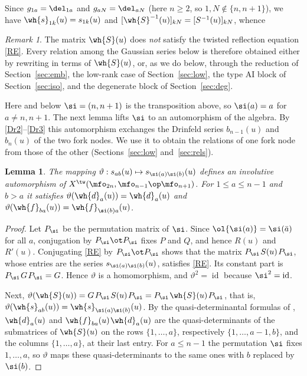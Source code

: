 \documentclass{amsart}
\newtheorem{lemma}[theorem]{Lemma}
\numberwithin{equation}{section}
\theoremstyle{remark}
\newtheorem{remark}[theorem]{Remark}
\DeclareMathOperator{\id}{id}
\renewcommand{\,}{\kern 0.1em} %
\begin{document}
Since $g_{1a} = \del_{1a}$ and $g_{aN} = \del_{aN}$ (here $n\ge2$, so $1,N\notin\{n,n+1\}$), we
have $\wh{s}_{1k}(u) = s_{1k}(u)$ and $[\wh{S}^{-1}(u)]_{kN} = [S^{-1}(u)]_{kN}$, whence
%
\equ{
s_{11}(u) = \wh{d}_1(u) , \qq \big[S^{-1}(u)\big]_{NN} = \wh{d}^{\,-1}_N(u) .
\label{corner}
}


\begin{remark} \label{R:not-RE}
%
The matrix $\wh{S}(u)$ does {\it not}  satisfy the twisted reflection equation \eqref{RE}. Every relation among the Gaussian series below is therefore obtained either by rewriting \cite[(2.19)]{Re26} in terms of $\wh{S}(u)$, or, as we do below,
through the reduction of Section~\ref{sec:emb}, the low-rank case of Section~\ref{sec:low},
the type AI block of Section~\ref{sec:iso}, and the degenerate block of Section~\ref{sec:deg}.
%
\end{remark}

Here and below $\si=(n,n+1)$ is the transposition above, so $\si(a)=a$ for $a\ne n,n+1$. The
next lemma lifts $\si$ to an automorphism of the algebra. By \eqref{Dr2}--\eqref{Dr3} this
automorphism exchanges the Drinfeld series $b_{n-1}(u)$ and $b_n(u)$ of the two fork nodes. We use
it to obtain the relations of one fork node from those of the other (Sections~\ref{sec:low}
and~\ref{sec:rels}).

\begin{lemma} \label{L:sigma}
%
The mapping $\vartheta : s_{ab}(u) \mapsto s_{\si(a)\si(b)}(u)$ defines an involutive automorphism
of $X^\tw(\mfo_{2n},\mfo_{n-1}\op\mfo_{n+1})$. For $1\le a\le n-1$ and $b>a$ it satisfies
$\vartheta(\wh{d}_a(u)) = \wh{d}_a(u)$ and $\vartheta(\wh{f}_{ba}(u)) = \wh{f}_{\si(b)a}(u)$.
%
\end{lemma}

\begin{proof}
%
Let $P_\si$ be the permutation matrix of $\si$. Since $\ol{\si(a)} = \si(\bar{a})$ for all $a$,
conjugation by $P_\si\ot P_\si$ fixes $P$ and $Q$, and hence $R(u)$ and $R'(u)$. Conjugating
\eqref{RE} by $P_\si\ot P_\si$ shows that the matrix $P_\si\,S(u)\,P_\si$, whose entries are the
series $s_{\si(a)\si(b)}(u)$, satisfies \eqref{RE}. Its constant part is $P_\si\,G\,P_\si = G$.
Hence $\vartheta$ is a homomorphism, and $\vartheta^2=\id$ because $\si^2=\id$.

Next, $\vartheta(\wh{S}(u)) = G\,P_\si\,S(u)\,P_\si = P_\si\,\wh{S}(u)\,P_\si$, that is,
$\vartheta(\wh{s}_{ab}(u)) = \wh{s}_{\si(a)\si(b)}(u)$. By the quasi-determinantal formulas of
\cite[\S3.1]{Re26}, $\wh{d}_a(u)$ and $\wh{f}_{ba}(u)\,\wh{d}_a(u)$ are the quasi-determinants of the
submatrices of $\wh{S}(u)$ on the rows $\{1,\ldots,a\}$, respectively $\{1,\ldots,a-1,b\}$, and
the columns $\{1,\ldots,a\}$, at their last entry. For $a\le n-1$ the permutation $\si$ fixes
$1,\ldots,a$, so $\vartheta$ maps these quasi-determinants to the same ones with $b$ replaced by
$\si(b)$.
%
\end{proof}
\end{document}
